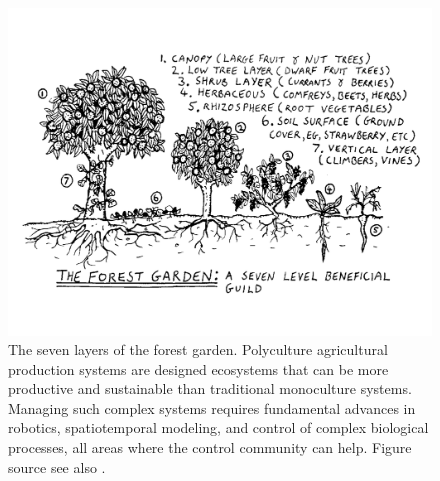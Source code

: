 \begin{figure}[tbh]
\includegraphics[width=\textwidth]{./figures/polyculture}
\caption{The seven layers of the forest garden. Polyculture agricultural production systems are designed ecosystems that can be more productive and sustainable than traditional monoculture systems. Managing such complex systems requires fundamental advances in robotics, spatiotemporal modeling, and control of complex biological processes, all areas where the control community can help. Figure source \cite{polyculture_fig}  see also \cite{rhodes2012feeding}.}
\label{fig:polycultures}
\end{figure}


